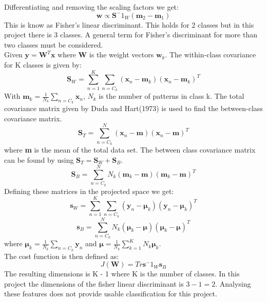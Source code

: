 Differentiating and removing the scaling factors we get:
\begin{equation}
\textbf{w} \propto \textbf{S}^-1_W ( \textbf{m}_2 - \textbf{m}_1 )
\end{equation}
This is know as Fisher's linear discriminant. This holds for 2 classes but in this project there is 3 classes. A general term for Fisher's discriminant for more than two classes must be considered.\\
Given $\textbf{y} = \textbf{W}^T\textbf{x}$ where \textbf{W} is the weight vectors $\textbf{w}_k$. The within-class covariance for K classes is given by: 
\begin{equation}
\textbf{S}_W = \sum^K_{n=1} \sum_{n=C_k} (\textbf{x}_n - \textbf{m}_k)(\textbf{x}_n - \textbf{m}_k)^T 
\end{equation}
With $\textbf{m}_k = \frac{1}{N_k}\sum_{n=C_k} \textbf{x}_n$, $N_k$ is the number of patterns in class k. The total covariance matrix given by Duda and Hart(1973) is used to find the between-class covariance matrix.
\begin{equation}
\textbf{S}_T = \sum^N_{n=C_k}(\textbf{x}_n - \textbf{m})(\textbf{x}_n - \textbf{m})^T 
\end{equation}
where \textbf{m} is the mean of the total data set. The between class covariance matrix can be found by using $\textbf{S}_T = \textbf{S}_W + \textbf{S}_B$.
\begin{equation}
\textbf{S}_B = \sum^N_{n=C_k} N_k(\textbf{m}_k - \textbf{m})(\textbf{m}_k - \textbf{m})^T 
\end{equation}
Defining these matrices in the projected space we get:
\begin{equation}
\textbf{s}_W = \sum^K_{n=1} 
\sum_{n=C_k} (\textbf{y}_n - 
\boldsymbol{\mu}_k)
(\textbf{y}_n - 
\boldsymbol{\mu}_k)^T 
\end{equation}
\begin{equation}
\textbf{s}_B = \sum^N_{n=C_k} N_k(\boldsymbol{\mu}_k - \boldsymbol{\mu})(\boldsymbol{\mu}_k - \boldsymbol{\mu})^T 
\end{equation}
where $\boldsymbol{\mu}_k = \frac{1}{N_k}\sum_{n=C_k}\textbf{y}_n$ 
and $\boldsymbol{\mu} = \frac{1}{N_k}\sum^K_{k=1}N_k \boldsymbol{\mu}_k$.\\
The cost function is then defined as:
\begin{equation}
J(\textbf{W}) =  Tr{\textbf{s}^-1_W\textbf{s}_B}
\end{equation}
The resulting dimensions is K - 1  where K is the number of classes. In this project the dimensions of the fisher linear discriminant is $3 - 1 = 2$. Analysing these features does not provide usable classification for this project.

